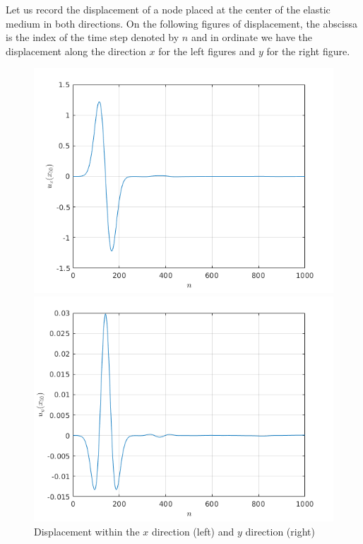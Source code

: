 Let us record the displacement of a node placed at the center of the elastic medium in both directions. On the following figures of displacement, the abscissa is the index of the time step denoted by $n$ and in ordinate we have the displacement along the direction $x$ for the left figures and $y$ for the right figure. 
\begin{figure}[H]
\centering
\begin{minipage}{.5\textwidth}
  \centering
  \includegraphics[width=1.\linewidth]{images/disp_imp_x.png}
\end{minipage}%
\begin{minipage}{.5\textwidth}
  \centering
  \includegraphics[width=1.\linewidth]{images/disp_imp_y.png}
\end{minipage}
\caption{Displacement within the $x$ direction (left) and $y$ direction (right)}
\label{fig:disp_imp_pml}
\end{figure} 
